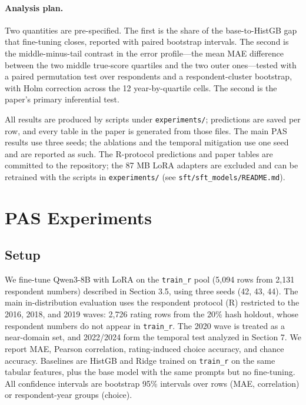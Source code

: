 \paragraph{Analysis plan.} Two quantities are pre-specified. The first is
the share of the base-to-HistGB gap that fine-tuning closes, reported
with paired bootstrap intervals. The second is the middle-minus-tail
contrast in the error profile---the mean MAE difference between the two
middle true-score quartiles and the two outer ones---tested with a
paired permutation test over respondents and a respondent-cluster
bootstrap, with Holm correction across the 12 year-by-quartile cells.
The second is the paper's primary inferential test.

All results are produced by scripts under \texttt{experiments/};
predictions are saved per row, and every table in the paper is generated
from those files. The main PAS results use three seeds; the ablations
and the temporal mitigation use one seed and are reported as such. The
R-protocol predictions and paper tables are committed to the repository;
the 87 MB LoRA adapters are excluded and can be retrained with the
scripts in \texttt{experiments/} (see
\texttt{sft/sft\_models/README.md}).

\section{PAS Experiments}\label{pas-experiments}

\subsection{Setup}\label{setup}

We fine-tune Qwen3-8B with LoRA on the \texttt{train\_r} pool (5,094
rows from 2,131 respondent numbers) described in Section 3.5, using
three seeds (42, 43, 44). The main in-distribution evaluation uses the
respondent protocol (R) restricted to the 2016, 2018, and 2019 waves:
2,726 rating rows from the 20\% hash holdout, whose respondent numbers
do not appear in \texttt{train\_r}. The 2020 wave is treated as a
near-domain set, and 2022/2024 form the temporal test analyzed in
Section 7. We report MAE, Pearson correlation, rating-induced choice
accuracy, and chance accuracy. Baselines are HistGB and Ridge trained on
\texttt{train\_r} on the same tabular features, plus the base model with
the same prompts but no fine-tuning. All confidence intervals are
bootstrap 95\% intervals \citep{efron1993bootstrap} over rows (MAE,
correlation) or respondent-year groups (choice).

